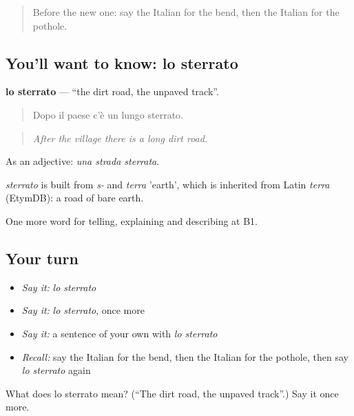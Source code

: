 \label{lesson:IT-C414-sterrato}



\begin{quote}
Before the new one: say the Italian for the bend, then the Italian for the pothole.
\end{quote}

\subsection*{You'll want to know: lo sterrato}
\textbf{lo sterrato} — \textquotedblleft{}the dirt road, the unpaved track\textquotedblright{}.

\begin{quote}
Dopo il paese c'è un lungo sterrato.
\end{quote}

\begin{quote}
\emph{After the village there is a long dirt road.}
\end{quote}

As an adjective: \emph{una strada sterrata}.

\begin{cousinweb}
\emph{sterrato} is built from \emph{s-} and \emph{terra} 'earth', which is inherited from Latin \emph{terra} (EtymDB): a road of bare earth.
\end{cousinweb}

\begin{grammarlens}[title={What you've built}]
One more word for telling, explaining and describing at B1.
\end{grammarlens}

\subsection*{Your turn}
\begin{itemize}
\raggedright
  \item \emph{Say it:} \emph{lo sterrato}
  \item \emph{Say it:} \emph{lo sterrato}, once more
  \item \emph{Say it:} a sentence of your own with \emph{lo sterrato}
  \item \emph{Recall:} say the Italian for the bend, then the Italian for the pothole, then say \emph{lo sterrato} again
\end{itemize}

\begin{tcolorbox}[breakable,colback=teal!4,colframe=teal!35!black,title={Before you move on}]
What does lo sterrato mean? (\textquotedblleft{}The dirt road, the unpaved track\textquotedblright{}.) Say it once more.
\end{tcolorbox}
